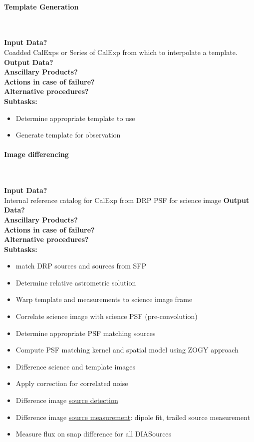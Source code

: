 \paragraph{Template Generation}~

\noindent
{\bf Input Data?}\\
Coadded CalExps or Series of CalExp from which to interpolate a
template. 
{\bf Output Data?}\\
{\bf Anscillary Products?}\\
{\bf Actions in case of failure?}\\
{\bf Alternative procedures?}\\

\noindent
{\bf Subtasks:}
\begin{itemize}
\item Determine appropriate template to use
\item Generate template for observation
\end{itemize}

\paragraph{Image differencing}~

\noindent
{\bf Input Data?}\\
Internal reference catalog for CalExp from DRP 
PSF for science image
{\bf Output Data?}\\
{\bf Anscillary Products?}\\
{\bf Actions in case of failure?}\\
{\bf Alternative procedures?}\\

\noindent
{\bf Subtasks:}
\begin{itemize}
\item match DRP sources and sources from SFP
\item Determine relative astrometric solution
\item Warp template and measurements to science image frame
\item Correlate science image with science PSF (pre-convolution)
\item Determine appropriate PSF matching sources
\item Compute PSF matching kernel and spatial model using ZOGY approach
\item Difference science and template images
\item Apply correction for correlated noise
\item Difference image \hyperref[sec:detection]{source detection}
\item Difference image  \hyperref[sec:measurement]{source
    measurement}: dipole fit, trailed source measurement
\item Measure flux on snap difference for all DIASources
\end{itemize}

